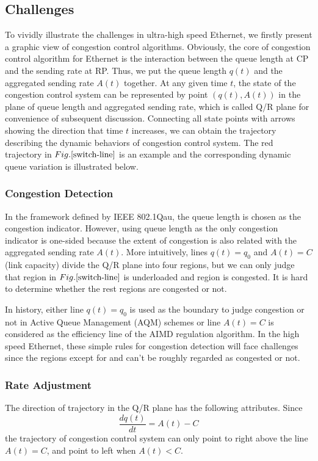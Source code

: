\documentclass{sig-alternate-10pt}
\def\figurename{Fig.}
\begin{document}
\subsection{Challenges}
To vividly illustrate the challenges in ultra-high speed Ethernet, we firstly present a graphic view of congestion control algorithms. Obviously, the core of congestion control algorithm for Ethernet is the interaction between the queue length at CP and the sending rate at RP. Thus, we put the queue length $q(t)$ and the aggregated sending rate $A(t)$ together. At any given time $t$, the state of the congestion control system can be represented by point $(q(t), A(t))$ in the plane of queue length and aggregated sending rate, which is called Q/R plane for convenience of subsequent discussion. Connecting all state points with arrows showing the direction that time $t$ increases, we can obtain the trajectory describing the dynamic behaviors of congestion control system. The red trajectory in $\figurename{\ref{switch-line}}$ is an example and the corresponding dynamic queue variation is illustrated below.


\subsubsection{Congestion Detection}
In the framework defined by IEEE 802.1Qau, the queue length is chosen as the congestion indicator. However, using queue length as the only congestion indicator is one-sided because the extent of congestion is also related with the aggregated sending rate $A(t)$. More intuitively, lines $q(t)=q_0$ and $A(t)=C$ (link capacity) divide the Q/R plane into four regions, but we can only judge that region  in $\figurename{\ref{switch-line}}$ is underloaded and region  is congested. It is hard to determine whether the rest regions are congested or not.

In history, either line $q(t)=q_0$ is used as the boundary to judge congestion or not in Active Queue Management (AQM) schemes or line $A(t)=C$ is considered as the efficiency line of the AIMD regulation algorithm. In the high speed Ethernet, these simple rules for congestion detection will face challenges since the regions except for  and  can't be roughly regarded as congested or not. 



\subsubsection{Rate Adjustment}
The direction of trajectory in the Q/R plane has the following attributes. Since 
\begin{equation}
\frac{dq(t)}{dt}=A(t)-C
\label{queue}
\end{equation}
the trajectory of congestion control system can only point to right above the line $A(t)=C$, and point to left when $A(t)<C$. 
\end{document}
